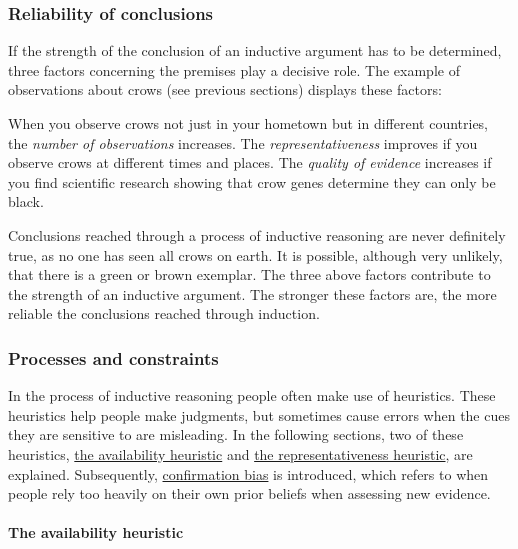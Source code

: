\documentclass[
]{krantz}
\begin{document}
\subsubsection*{Reliability of conclusions}\label{reliability-of-conclusions}


If the strength of the conclusion of an inductive argument has to be determined, three factors concerning the premises play a decisive role. The example of observations about crows (see previous sections) displays these factors:

When you observe crows not just in your hometown but in different countries, the \emph{number of observations} increases. The \emph{representativeness} improves if you observe crows at different times and places. The \emph{quality of evidence} increases if you find scientific research showing that crow genes determine they can only be black.

Conclusions reached through a process of inductive reasoning are never definitely true, as no one has seen all crows on earth. It is possible, although very unlikely, that there is a green or brown exemplar. The three above factors contribute to the strength of an inductive argument. The stronger these factors are, the more reliable the conclusions reached through induction.

\subsubsection*{Processes and constraints}\label{processes-and-constraints}


In the process of inductive reasoning people often make use of heuristics. These heuristics help people make judgments, but sometimes cause errors when the cues they are sensitive to are misleading. In the following sections, two of these heuristics, \hyperref[the-availability-heuristic]{the availability heuristic} and \hyperref[the-representativeness-heuristic]{the representativeness heuristic}, are explained. Subsequently, \hyperref[confirmation-bias]{confirmation bias} is introduced, which refers to when people rely too heavily on their own prior beliefs when assessing new evidence.

\paragraph*{The availability heuristic}\label{the-availability-heuristic}
\end{document}
